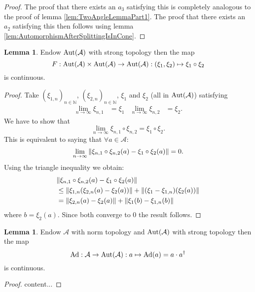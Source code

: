 \documentclass[12pt,a4paper,twoside]{article}
\let\originalleft\left
\let\originalright\right
\renewcommand{\left}{\mathopen{}\mathclose\bgroup\originalleft}
\renewcommand{\right}{\aftergroup\egroup\originalright}
\renewcommand{\AA}{\mathcal A}
\newcommand{\NN}{\mathbb{N}}
\newcommand{\Ad}[1]{\textrm{Ad}\left(#1\right)}
\newcommand{\Aut}[1]{\textrm{Aut}\left(#1\right)}
\theoremstyle{definition}
\newtheorem{lemma}[theorem]{Lemma}
\numberwithin{equation}{section}
\begin{document}
\begin{proof}
	The proof that there exists an $a_3$ satisfying this is completely analogous to the proof of lemma \ref{lem:TwoAngleLemmaPart1}. The proof that there exists an $a_2$ satisfying this then follows using lemma \ref{lem:AutomorphismAfterSplittingIsInCone}.
\end{proof}
\begin{lemma}\label{lem:AddingAutomorphismsIsContinuous}
	Endow $\Aut{\AA}$ with strong topology then the map
	\begin{equation}
		F:\Aut{\AA}\times\Aut{\AA}\rightarrow\Aut{\AA}:(\xi_1,\xi_2)\mapsto \xi_1\circ\xi_2
	\end{equation}
	is continuous.
\end{lemma}
\begin{proof}
	Take $(\xi_{1,n})_{n\in\NN}$, $(\xi_{2,n})_{n\in\NN}$, $\xi_1$ and $\xi_2$ (all in $\Aut{\AA}$) satisfying
	\begin{align}
		\lim_{n\rightarrow\infty}\xi_{n,1}&=\xi_1&\lim_{n\rightarrow\infty}\xi_{n,2}&=\xi_2.
	\end{align}
	We have to show that
	\begin{equation}
		\lim_{n\rightarrow\infty}\xi_{n,1}\circ\xi_{n,2}=\xi_1\circ\xi_2.
	\end{equation}
	This is equivalent to saying that $\forall a\in\AA:$
	\begin{equation}
		\lim_{n\rightarrow\infty}\norm{\xi_{n,1}\circ\xi_{n,2}(a)-\xi_1\circ\xi_2(a)}=0.
	\end{equation}
	Using the triangle inequality we obtain:
	\begin{align}
		&\norm{\xi_{n,1}\circ\xi_{n,2}(a)-\xi_1\circ\xi_2(a)}\\
		&\leq \norm{\xi_{1,n}\left(\xi_{2,n}(a)-\xi_{2}(a)\right)}+\norm{(\xi_1-\xi_{1,n})(\xi_2(a))}\\
		&=\norm{\xi_{2,n}(a)-\xi_{2}(a)}+\norm{\xi_1(b)-\xi_{1,n}(b)}
	\end{align}
	where $b=\xi_2(a).$ Since both converge to $0$ the result follows.
\end{proof}
\begin{lemma}\label{lem:AdjointIsContinuous}
	Endow $\AA$ with norm topology and $\Aut{\AA}$ with strong topology then the map
	\begin{equation}
		\text{Ad}:\AA\rightarrow \Aut{\AA}:a\mapsto \Ad{a}= a\cdot a^\dagger
	\end{equation}
	is continuous.
\end{lemma}
\begin{proof}
	content...
\end{proof}
\end{document}
